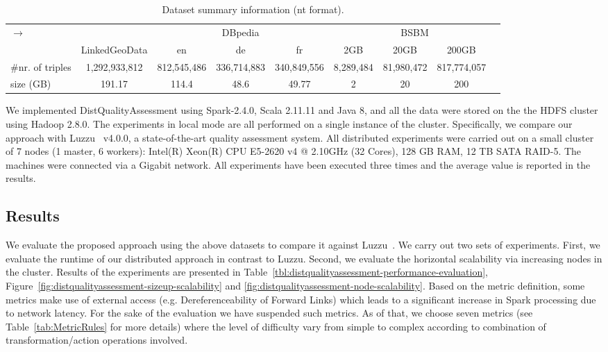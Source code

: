 \begin{table}
\centering
{\caption{Dataset summary information (nt format).}\label{tab:qa-dataset_info}}
\begin{tabularx}{\textwidth}{Xcccccccc}	
\toprule
\multirow{2}{*}{$\longrightarrow$} & \multicolumn{1}{c}{} & \multicolumn{3}{c|}{DBpedia} & \multicolumn{4}{c}{BSBM} \\
\cline{3-9}  \rule{0pt}{10pt}
& LinkedGeoData & \scriptsize{en} & \scriptsize{de} & \scriptsize{fr}  & \scriptsize{2GB} &\scriptsize{20GB} &\scriptsize{200GB} &\\
\midrule
\scriptsize{\#nr. of triples}& \scriptsize{1,292,933,812} & \scriptsize{812,545,486} & \scriptsize{336,714,883} & \scriptsize{340,849,556} & \scriptsize{8,289,484} & \scriptsize{81,980,472} & \scriptsize{817,774,057} &  \\
\scriptsize{size (GB)} & \scriptsize{191.17} & \scriptsize{114.4} & \scriptsize{48.6} & \scriptsize{49.77} & \scriptsize{2} &\scriptsize{20} &\scriptsize{200} &\\
\bottomrule
\end{tabularx}
\end{table}

We implemented DistQualityAssessment using Spark-2.4.0, Scala 2.11.11 and Java 8, and all the data were stored on the the HDFS cluster using Hadoop 2.8.0.
The experiments in local mode are all performed on a single instance of the cluster.
Specifically, we compare our approach with Luzzu~\cite{debattista2016luzzu} v4.0.0, a state-of-the-art quality assessment system.
All distributed experiments were carried out on a small cluster of 7 nodes (1 master, 6 workers): Intel(R) Xeon(R) CPU E5-2620 v4 @ 2.10GHz (32 Cores), 128 GB RAM, 12 TB SATA RAID-5.
The machines were connected via a Gigabit network.
All experiments have been executed three times and the average value is reported in the results.

\subsection{Results}

We evaluate the proposed approach using the above datasets to compare it against Luzzu~\cite{debattista2016luzzu}.
We carry out two sets of experiments.
First, we evaluate the runtime of our distributed approach in contrast to Luzzu.
Second, we evaluate the horizontal scalability via increasing nodes in the cluster.
Results of the experiments are presented in Table~\ref{tbl:distqualityassessment-performance-evaluation}, Figure~\ref{fig:distqualityassessment-sizeup-scalability} and
\ref{fig:distqualityassessment-node-scalability}.
Based on the metric definition, some metrics make use of external access (e.g. Dereferenceability of Forward Links) which leads to a significant increase in Spark processing due to network latency. 
For the sake of the evaluation we have suspended such metrics.
As of that, we choose seven metrics (see Table~\ref{tab:MetricRules} for more details) where the level of difficulty vary from simple to complex according to combination of transformation/action operations involved.

